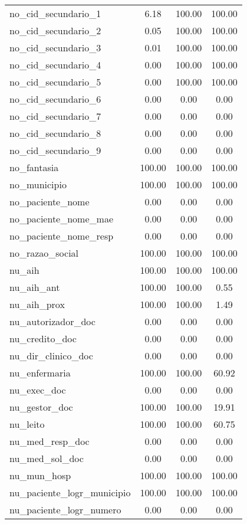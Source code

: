 \documentclass[
  12,
  table]{proadi}
\begin{document}
\begin{longtable}{lccc}
no\_cid\_secundario\_1 & 6.18 & 100.00 & 100.00\\
\addlinespace
no\_cid\_secundario\_2 & 0.05 & 100.00 & 100.00\\
no\_cid\_secundario\_3 & 0.01 & 100.00 & 100.00\\
no\_cid\_secundario\_4 & 0.00 & 100.00 & 100.00\\
no\_cid\_secundario\_5 & 0.00 & 100.00 & 100.00\\
no\_cid\_secundario\_6 & 0.00 & 0.00 & 0.00\\
\addlinespace
no\_cid\_secundario\_7 & 0.00 & 0.00 & 0.00\\
no\_cid\_secundario\_8 & 0.00 & 0.00 & 0.00\\
no\_cid\_secundario\_9 & 0.00 & 0.00 & 0.00\\
no\_fantasia & 100.00 & 100.00 & 100.00\\
no\_municipio & 100.00 & 100.00 & 100.00\\
\addlinespace
no\_paciente\_nome & 0.00 & 0.00 & 0.00\\
no\_paciente\_nome\_mae & 0.00 & 0.00 & 0.00\\
no\_paciente\_nome\_resp & 0.00 & 0.00 & 0.00\\
no\_razao\_social & 100.00 & 100.00 & 100.00\\
nu\_aih & 100.00 & 100.00 & 100.00\\
\addlinespace
nu\_aih\_ant & 100.00 & 100.00 & 0.55\\
nu\_aih\_prox & 100.00 & 100.00 & 1.49\\
nu\_autorizador\_doc & 0.00 & 0.00 & 0.00\\
nu\_credito\_doc & 0.00 & 0.00 & 0.00\\
nu\_dir\_clinico\_doc & 0.00 & 0.00 & 0.00\\
\addlinespace
nu\_enfermaria & 100.00 & 100.00 & 60.92\\
nu\_exec\_doc & 0.00 & 0.00 & 0.00\\
nu\_gestor\_doc & 100.00 & 100.00 & 19.91\\
nu\_leito & 100.00 & 100.00 & 60.75\\
nu\_med\_resp\_doc & 0.00 & 0.00 & 0.00\\
\addlinespace
nu\_med\_sol\_doc & 0.00 & 0.00 & 0.00\\
nu\_mun\_hosp & 100.00 & 100.00 & 100.00\\
nu\_paciente\_logr\_municipio & 100.00 & 100.00 & 100.00\\
nu\_paciente\_logr\_numero & 0.00 & 0.00 & 0.00\\

\end{longtable}
\end{document}
